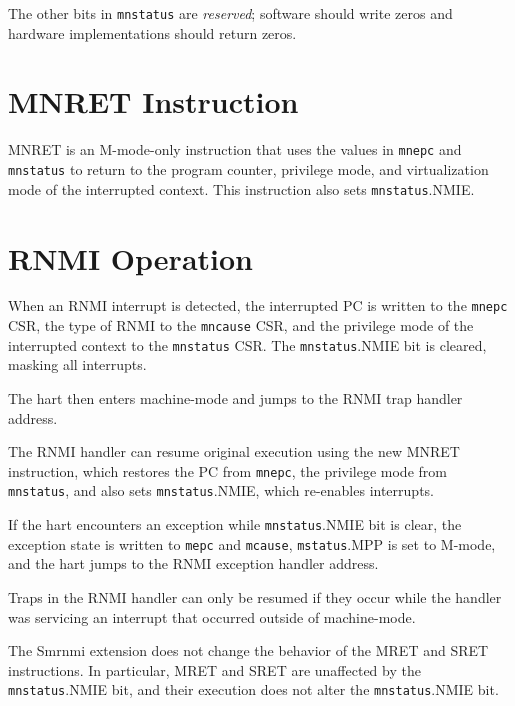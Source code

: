 The other
bits in {\tt mnstatus} are {\em reserved}; software should write zeros and
hardware implementations should return zeros.

\section{MNRET Instruction}

MNRET is an M-mode-only instruction that uses the values in {\tt mnepc} and
{\tt mnstatus} to return to the program counter, privilege mode,
and virtualization mode of the interrupted context.
This instruction also sets {\tt mnstatus}.NMIE.

\section{RNMI Operation}

When an RNMI interrupt is detected, the interrupted PC is written to
the {\tt mnepc} CSR, the type of RNMI to the {\tt mncause} CSR, and the
privilege mode of the interrupted context to the {\tt mnstatus} CSR.
The {\tt mnstatus}.NMIE bit is cleared, masking all interrupts.

The hart then enters machine-mode and jumps to the RNMI trap handler
address.

The RNMI handler can resume original execution using the new MNRET
instruction, which restores the PC from {\tt mnepc}, the privilege mode
from {\tt mnstatus}, and also sets {\tt mnstatus}.NMIE, which
re-enables interrupts.

If the hart encounters an exception while {\tt mnstatus}.NMIE bit is clear, the
exception state is written to {\tt mepc} and {\tt mcause}, {\tt mstatus}.MPP is
set to M-mode, and the hart jumps to the RNMI exception handler
address.

\begin{commentary}
Traps in the RNMI handler can only be resumed if they occur while
the handler was servicing an interrupt that occurred outside of
machine-mode.
\end{commentary}

\begin{commentary}
The Smrnmi extension does not change the behavior of the MRET and SRET
instructions.
In particular, MRET and SRET are unaffected by the {\tt mnstatus}.NMIE bit,
and their execution does not alter the {\tt mnstatus}.NMIE bit.
\end{commentary}
